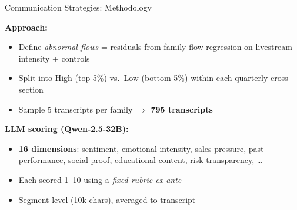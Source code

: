 \documentclass[11pt, aspectratio=169]{beamer}
\newcommand{\hl}[1]{\textcolor{myblue}{\textbf{#1}}}
\begin{document}

\begin{frame}{Communication Strategies: Methodology}

\textbf{Approach:}
\begin{itemize}
  \item Define \textit{abnormal flows} = residuals from family
  flow regression on livestream intensity + controls
  \item Split into High (top 5\%) vs.\ Low (bottom 5\%)
  within each quarterly cross-section
  \item Sample 5 transcripts per family $\Rightarrow$ \hl{795 transcripts}
\end{itemize}

\vspace{0.35cm}
\textbf{LLM scoring (Qwen-2.5-32B):}
\begin{itemize}
  \item \hl{16 dimensions}: sentiment, emotional intensity,
  sales pressure, past performance, social proof,
  educational content, risk transparency, \ldots
  \item Each scored 1--10 using a \textit{fixed rubric ex ante}
  \item Segment-level (10k chars), averaged to transcript
\end{itemize}

\end{frame}

\end{document}
